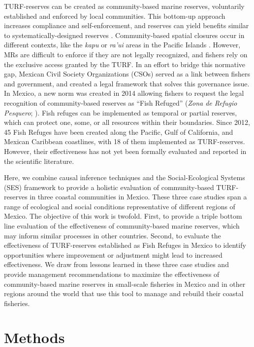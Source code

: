 \documentclass{frontiersSCNS}
\theoremstyle{definition}
\theoremstyle{definition}
\theoremstyle{definition}
\theoremstyle{remark}
\begin{document}
TURF-reserves can be created as community-based marine reserves,
voluntarily established and enforced by local communities. This
bottom-up approach increases compliance and self-enforcement, and
reserves can yield benefits similar to systematically-designed reserves
\citep{gelcich_2015-Gw,espinosaromero_2014-PY,beger_2004-Y8,smallhornwest_2018}.
Community-based spatial closures occur in different contexts, like the
\emph{kapu} or \emph{ra'ui} areas in the Pacific Islands
\citep{bohnsack_2004,johannes_2002}. However, MRs are difficult to
enforce if they are not legally recognized, and fishers rely on the
exclusive access granted by the TURF. In an effort to bridge this
normative gap, Mexican Civil Society Organizations (CSOs) served as a
link between fishers and government, and created a legal framework that
solves this governance issue. In Mexico, a new norm was created in 2014
allowing fishers to request the legal recognition of community-based
reserves as ``Fish Refuged'' (\emph{Zona de Refugio Pesquero};
\citet{nom}). Fish refuges can be implemented as temporal or partial
reserves, which can protect one, some, or all resources within their
boundaries. Since 2012, 45 Fish Refuges have been created along the
Pacific, Gulf of California, and Mexican Caribbean coastlines, with 18
of them implemented as TURF-reserves. However, their effectiveness has
not yet been formally evaluated and reported in the scientific
literature.

Here, we combine causal inference techniques and the Social-Ecological
Systems (SES) framework to provide a holistic evaluation of
community-based TURF-reserves in three coastal communities in Mexico.
These three case studies span a range of ecological and social
conditions representative of different regions of Mexico. The objective
of this work is twofold. First, to provide a triple bottom line
evaluation of the effectiveness of community-based marine reserves,
which may inform similar processes in other countries. Second, to
evaluate the effectiveness of TURF-reserves established as Fish Refuges
in Mexico to identify opportunities where improvement or adjustment
might lead to increased effectiveness. We draw from lessons learned in
these three case studies and provide management recommendations to
maximize the effectiveness of community-based marine reserves in
small-scale fisheries in Mexico and in other regions around the world
that use this tool to manage and rebuild their coastal fisheries.

\section{Methods}\label{methods}
\end{document}
